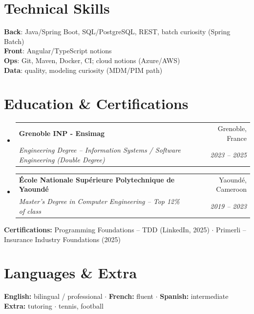 \documentclass[letterpaper,10.5pt]{article}
\makeatletter
\newcommand{\resumeSubheading}[4]{\vspace{-1pt}\item\begin{tabular*}{0.97\textwidth}[t]{l@{\extracolsep{\fill}}r}\textbf{#1} & #2 \\\textit{\small#3} & \textit{\small #4} \\\end{tabular*}\vspace{-5pt}}
\newcommand{\resumeSubHeadingListStart}{\begin{itemize}[leftmargin=0.15in, label={}]}
\newcommand{\resumeSubHeadingListEnd}{\end{itemize}}
\makeatother
\begin{document}
\section{Technical Skills}
\begin{itemize}[leftmargin=0.15in, label={}]\small{\item{\textbf{Back}: Java/Spring Boot, SQL/PostgreSQL, REST, batch curiosity (Spring Batch) \\ \textbf{Front}: Angular/TypeScript notions \\ \textbf{Ops}: Git, Maven, Docker, CI; cloud notions (Azure/AWS) \\ \textbf{Data}: quality, modeling curiosity (MDM/PIM path)}}\end{itemize}
\section{Education \& Certifications}
\resumeSubHeadingListStart
  \resumeSubheading{Grenoble INP - Ensimag}{Grenoble, France}{Engineering Degree -- Information Systems / Software Engineering (Double Degree)}{2023 -- 2025}
  \resumeSubheading{\'Ecole Nationale Sup\'erieure Polytechnique de Yaound\'e}{Yaound\'e, Cameroon}{Master's Degree in Computer Engineering -- Top 12\% of class}{2019 -- 2023}
\resumeSubHeadingListEnd
\small{\textbf{Certifications:} Programming Foundations -- TDD (LinkedIn, 2025) $\cdot$ Primerli -- Insurance Industry Foundations (2025)}
\section{Languages \& Extra}
\small{\textbf{English:} bilingual / professional $\cdot$ \textbf{French:} fluent $\cdot$ \textbf{Spanish:} intermediate \\ \textbf{Extra:} tutoring $\cdot$ tennis, football}
\end{document}
